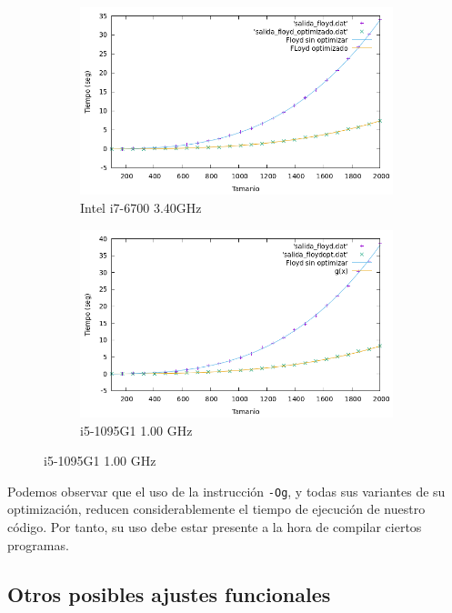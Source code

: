 \documentclass[10pt,a4paper]{article}
\begin{document}
\begin{figure}[h!]
\begin{subfigure}{.33\textwidth}
	\centering
	\includegraphics[scale=0.25]{../../Images/floyd_opt_Javi5454.png}
	\caption{Intel i7-6700 3.40GHz}
	\label{Floyd Optimizado Javi5454}
\end{subfigure}
\hspace{1cm}
\begin{subfigure}{.33\textwidth}
	\centering
	\includegraphics[scale=0.25]{../../Images/floyd_opt_Jota.png}
	\caption{i5-1095G1 1.00 GHz}
	\label{Floyd Optimizado Jota}
\end{subfigure}
\end{figure}

Podemos observar que el uso de la instrucción \texttt{-Og}, y todas sus variantes de su optimización, reducen considerablemente el tiempo de ejecución de nuestro código. Por tanto, su uso debe estar presente a la hora de compilar ciertos programas.

\subsection{Otros posibles ajustes funcionales}
\end{document}
